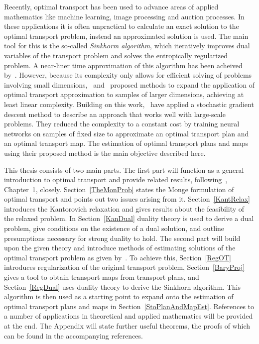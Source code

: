 Recently, optimal transport has been used to advance areas of applied mathematics like machine learning, image processing and auction processes. In these applications it is often unpractical to calculate an exact solution to the optimal transport problem, instead an approximated solution is used. The main tool for this is the so-called \textit{Sinkhorm algorithm}, which iteratively improves dual variables of the transport problem and solves the entropically regularized problem. A near-liner time approximation of this algorithm has been acheived by\ \cite{Alts2019}. However, because its complexity only allows for efficient solving of problems involving small dimensions,\ \cite{Gene2016} and\ \cite{Arjo2017} proposed methods to expand the application of optimal transport approximation to samples of larger dimensions, achieving at least linear complexity. Building on this work,\ \cite{Seg2018} have applied a stochastic gradient descent method to describe an approach that works well with large-scale problems. They reduced the complexity to a constant cost by training neural networks on samples of fixed size to approximate an optimal transport plan and an optimal transport map. The estimation of optimal transport plans and maps using their proposed method is the main objective described here.

This thesis consists of two main parts. The first part will function as a general introduction to optimal transport and provide related results, following\ \cite{San2015}, Chapter~1, closely. Section~\ref{TheMonProb} states the Monge formulation of optimal transport and points out two issues arising from it. Section~\ref{KantRelax} introduces the Kantorovich relaxation and gives results about the feasibility of the relaxed problem. In Section~\ref{KanDual} duality theory is used to derive a dual problem, give conditions on the existence of a dual solution, and outline presumptions necessary for strong duality to hold. The second part will build upon the given theory and introduce methods of estimating solutions of the optimal transport problem as given by\ \cite{Seg2018}. To achieve this, Section~\ref{RegOT} introduces regularization of the original transport problem, Section~\ref{BaryProj} gives a tool to obtain transport maps from transport plans, and Section~\ref{RegDual} uses duality theory to derive the Sinkhorn algorithm. This algorithm is then used as a starting point to expand onto the estimation of optimal transport plans and maps in Section~\ref{StoPlanAndMapEst}. References to a number of applications in theoretical and applied mathematics will be provided at the end. The Appendix will state further useful theorems, the proofs of which can be found in the accompanying references.